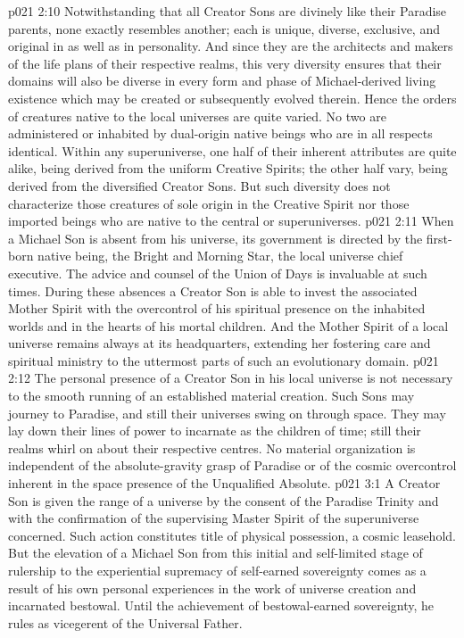 \vs p021 2:10 Notwithstanding that all Creator Sons are divinely like their Paradise parents, none exactly resembles another; each is unique, diverse, exclusive, and original in  as well as in personality. And since they are the architects and makers of the life plans of their respective realms, this very diversity ensures that their domains will also be diverse in every form and phase of Michael\hyp{}derived living existence which may be created or subsequently evolved therein. Hence the orders of creatures native to the local universes are quite varied. No two are administered or inhabited by dual\hyp{}origin native beings who are in all respects identical. Within any superuniverse, one half of their inherent attributes are quite alike, being derived from the uniform Creative Spirits; the other half vary, being derived from the diversified Creator Sons. But such diversity does not characterize those creatures of sole origin in the Creative Spirit nor those imported beings who are native to the central or superuniverses.
\vs p021 2:11 \pc When a Michael Son is absent from his universe, its government is directed by the first\hyp{}born native being, the Bright and Morning Star, the local universe chief executive. The advice and counsel of the Union of Days is invaluable at such times. During these absences a Creator Son is able to invest the associated Mother Spirit with the overcontrol of his spiritual presence on the inhabited worlds and in the hearts of his mortal children. And the Mother Spirit of a local universe remains always at its headquarters, extending her fostering care and spiritual ministry to the uttermost parts of such an evolutionary domain.
\vs p021 2:12 The personal presence of a Creator Son in his local universe is not necessary to the smooth running of an established material creation. Such Sons may journey to Paradise, and still their universes swing on through space. They may lay down their lines of power to incarnate as the children of time; still their realms whirl on about their respective centres. No material organization is independent of the absolute\hyp{}gravity grasp of Paradise or of the cosmic overcontrol inherent in the space presence of the Unqualified Absolute.
\vs p021 3:1 A Creator Son is given the range of a universe by the consent of the Paradise Trinity and with the confirmation of the supervising Master Spirit of the superuniverse concerned. Such action constitutes title of physical possession, a cosmic leasehold. But the elevation of a Michael Son from this initial and self\hyp{}limited stage of rulership to the experiential supremacy of self\hyp{}earned sovereignty comes as a result of his own personal experiences in the work of universe creation and incarnated bestowal. Until the achievement of bestowal\hyp{}earned sovereignty, he rules as vicegerent of the Universal Father.
